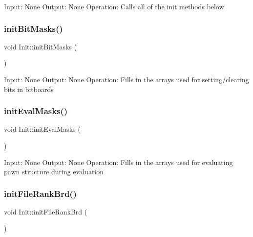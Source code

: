 Input\+: None Output\+: None Operation\+: Calls all of the \textquotesingle{}init\textquotesingle{} methods below \mbox{\label{namespaceInit_ae0ffdba0cdf68df3778883fc7d1d8a5f}} 
\subsubsection{\texorpdfstring{init\+Bit\+Masks()}{initBitMasks()}}
{\footnotesize\ttfamily void Init\+::init\+Bit\+Masks (\begin{DoxyParamCaption}{ }\end{DoxyParamCaption})\hspace{0.3cm}{\ttfamily [noexcept]}}

Input\+: None Output\+: None Operation\+: Fills in the arrays used for setting/clearing bits in bitboards \mbox{\label{namespaceInit_a836df13b70275ee90841a157d0e380dd}} 
\subsubsection{\texorpdfstring{init\+Eval\+Masks()}{initEvalMasks()}}
{\footnotesize\ttfamily void Init\+::init\+Eval\+Masks (\begin{DoxyParamCaption}{ }\end{DoxyParamCaption})\hspace{0.3cm}{\ttfamily [noexcept]}}

Input\+: None Output\+: None Operation\+: Fills in the arrays used for evaluating pawn structure during evaluation \mbox{\label{namespaceInit_abf211e7bffeba17a44b4da8cd83dbfcd}} 
\subsubsection{\texorpdfstring{init\+File\+Rank\+Brd()}{initFileRankBrd()}}
{\footnotesize\ttfamily void Init\+::init\+File\+Rank\+Brd (\begin{DoxyParamCaption}{ }\end{DoxyParamCaption})\hspace{0.3cm}{\ttfamily [noexcept]}}

